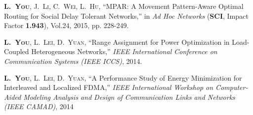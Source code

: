 


\begin{publications}{99}

%

\item\textsc{\textbf{L.~You}, J.~Li, C.~Wei, L.~Hu}, ``MPAR: A Movement Pattern-Aware Optimal Routing for Social Delay Tolerant Networks,'' in \textit{Ad Hoc Networks} (\textbf{SCI}, Impact Factor \textbf{1.943}), Vol.24, 2015, pp. 228-249.


%
\item\textsc{\textbf{L.~You}, L.~Lei, D.~Yuan}, ``Range Assignment for Power Optimization in Load-Coupled Heterogeneous Networks,'' \textit{IEEE International Conference on Communication Systems (IEEE ICCS)}, 2014.


%
\item\textsc{\textbf{L.~You}, L.~Lei, D.~Yuan}, ``A Performance Study of Energy Minimization for Interleaved and Localized FDMA,'' \textit{IEEE International Workshop on Computer-Aided Modeling Analysis and Design of Communication Links and Networks (IEEE CAMAD)}, 2014




\end{publications}
